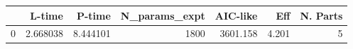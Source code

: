 \begin{tabular}{lrrrrrr}
\toprule
{} &    L-time &    P-time &  N\_params\_expt &  AIC-like &    Eff &  N. Parts \\
\midrule
0 &  2.668038 &  8.444101 &           1800 &  3601.158 &  4.201 &         5 \\
\bottomrule
\end{tabular}
